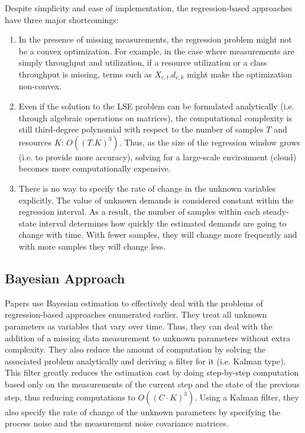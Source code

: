    Despite simplicity and ease of implementation, the regression-based approaches have three major shortcomings:
   \begin{enumerate}
   \item  In the presence of missing measurements, the regression problem might not be a convex optimization. For example, in the case where measurements are simply throughput and utilization, if a resource utilization or a class throughput is missing, terms such as $X_{c,t}.d_{c,k}$ might make the optimization non-convex.   
   \item  Even if the solution to the LSE problem can be formulated analytically (i.e. through algebraic operations on matrices), the computational complexity is still third-degree polynomial with respect to the number of samples $T$ and resources $K$: $O((T.K)^3)$. Thus, as the size of the regression window grows (i.e. to provide more accuracy), solving for a large-scale environment (cloud) becomes more computationally expensive.  
   \item There is no way to specify the rate of change in the unknown variables explicitly. The value of unknown demands is considered constant within the regression interval. As a result, the number of samples within each steady-state interval determines how quickly the estimated demands are going to change with time. With fewer samples, they will change more frequently and with more samples they will change less. 
     \end{enumerate}

    \subsection{Bayesian Approach}   
		Papers \cite{woodside_use_2005,xu_performance_2005,zheng_tracking_2005} use Bayesian estimation to effectively deal with the problems of regression-based approaches enumerated earlier. They treat all unknown parameters as variables that vary over time. Thus, they can deal with the addition of a missing data measurement to unknown parameters without extra complexity. They also reduce the amount of computation by solving the associated problem analytically and deriving a
        filter for it (i.e. Kalman type). This filter greatly reduces the estimation cost by doing step-by-step computation based only on the measurements of the current step and the state of the previous step, thus reducing computations to $O((C\cdot K)^3)$. Using a Kalman filter, they also specify the rate of change of the unknown parameters by specifying the process noise and the measurement noise covariance matrices. 

